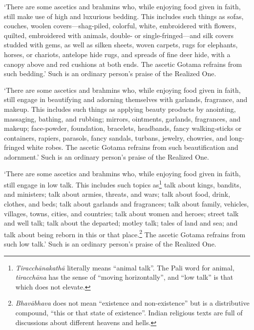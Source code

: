 \documentclass[12pt,openany]{book}%
\begin{document}
‘There are some ascetics and brahmins who, while enjoying food given in faith, still make use of high and luxurious bedding. This includes such things as sofas, couches, woolen covers—shag-piled, colorful, white, embroidered with flowers, quilted, embroidered with animals, double- or single-fringed—and silk covers studded with gems, as well as silken sheets, woven carpets, rugs for elephants, horses, or chariots, antelope hide rugs, and spreads of fine deer hide, with a canopy above and red cushions at both ends. The ascetic Gotama refrains from such bedding.’ Such is an ordinary person’s praise of the Realized One. 

‘There are some ascetics and brahmins who, while enjoying food given in faith, still engage in beautifying and adorning themselves with garlands, fragrance, and makeup. This includes such things as applying beauty products by anointing, massaging, bathing, and rubbing; mirrors, ointments, garlands, fragrances, and makeup; face-powder, foundation, bracelets, headbands, fancy walking-sticks or containers, rapiers, parasols, fancy sandals, turbans, jewelry, chowries, and long-fringed white robes. The ascetic Gotama refrains from such beautification and adornment.’ Such is an ordinary person’s praise of the Realized One. 

‘There are some ascetics and brahmins who, while enjoying food given in faith, still engage in low talk. This includes such topics as\footnote{\textit{\textsanskrit{Tiracchānakathā}} literally means “animal talk”. The Pali word for animal, \textit{\textsanskrit{tiracchāna}} has the sense of “moving horizontally”, and “low talk” is that which does not elevate. } talk about kings, bandits, and ministers; talk about armies, threats, and wars; talk about food, drink, clothes, and beds; talk about garlands and fragrances; talk about family, vehicles, villages, towns, cities, and countries; talk about women and heroes; street talk and well talk; talk about the departed; motley talk; tales of land and sea; and talk about being reborn in this or that place.\footnote{\textit{\textsanskrit{Bhavābhava}} does not mean “existence and non-existence” but is a distributive compound, “this or that state of existence”. Indian religious texts are full of discussions about different heavens and hells. } The ascetic Gotama refrains from such low talk.’ Such is an ordinary person’s praise of the Realized One. 
\end{document}
